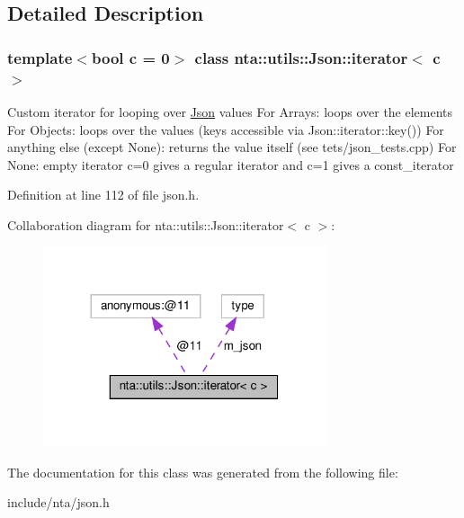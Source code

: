 \subsection{Detailed Description}
\subsubsection*{template$<$bool c = 0$>$\newline
class nta\+::utils\+::\+Json\+::iterator$<$ c $>$}

Custom iterator for looping over \hyperlink{classnta_1_1utils_1_1Json}{Json} values For Arrays\+: loops over the elements For Objects\+: loops over the values (keys accessible via Json\+::iterator\+::key()) For anything else (except None)\+: returns the value itself (see tets/json\+\_\+tests.\+cpp) For None\+: empty iterator c=0 gives a regular iterator and c=1 gives a const\+\_\+iterator 

Definition at line 112 of file json.\+h.



Collaboration diagram for nta\+:\+:utils\+:\+:Json\+:\+:iterator$<$ c $>$\+:\nopagebreak
\begin{figure}[H]
\begin{center}
\leavevmode
\includegraphics[width=236pt]{da/dc2/classnta_1_1utils_1_1Json_1_1iterator__coll__graph}
\end{center}
\end{figure}


The documentation for this class was generated from the following file\+:\begin{DoxyCompactItemize}
\item 
include/nta/json.\+h\end{DoxyCompactItemize}
